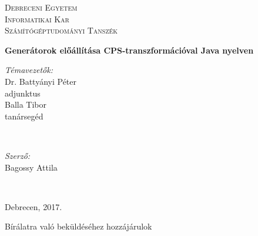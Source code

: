 %
%
%

\begin{titlepage}

\center

\textsc{\LARGE Debreceni Egyetem}\\[1.5cm]
\textsc{\Large Informatikai Kar}
\\[0.5cm]

\textsc{\large Számítógéptudományi Tanszék}
\\[2.5cm]

{\huge \bfseries Generátorok előállítása CPS-transzformációval Java nyelven \par}

\if{}
  \vspace*{6.5cm}

  \begin{minipage}[t]{0.4\textwidth}
    \begin{flushleft} 
      \large \textit{Témavezetők:} \\
      Dr. Battyányi Péter  \\
      adjunktus \\
      Balla Tibor \\
      tanársegéd 
      \par
    \end{flushleft}
  \end{minipage}
  ~
  \begin{minipage}[t]{0.4\textwidth}
    \begin{flushright}
      \large \textit{Szerző:}\\
      Bagossy Attila 
      \par
    \end{flushright}
  \end{minipage}
  \\[2.5cm]
\else
  \vspace*{10.5cm}
\fi

{\large Debrecen, 2017.}\\ 

\begin{flushleft}
	Bírálatra való beküldéséhez hozzájárulok
\end{flushleft}

\vfill

\end{titlepage}